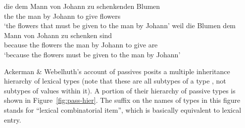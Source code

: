 \documentclass[output=paper
 	        ,biblatex
                ,babelshorthands
                ,newtxmath
                ,draftmode
                ,colorlinks, citecolor=brown
]{langscibook}
\begin{document}
\begin{exe}
	\ex\label{zu-pass}
	\begin{xlist}
		\ex\label{zu-pass-a}
		\gll die dem Mann von Johann zu schenkenden Blumen \\
		the the man by Johann to give flowers  \\
		\glt `the flowers that must be given to the man by Johann'
		\ex\label{zu-pass-b}
		\gll weil die Blumen dem Mann von Johann zu schenken sind \\
		because the flowers the man by Johann to give are \\
		\glt `because the flowers must be given to the man by Johann'
	\end{xlist}
\end{exe}

Ackerman \& Webelhuth's account of  passives posits a multiple inheritance hierarchy of lexical types (note that these are all subtypes of a type , not subtypes of values within it). A portion of their hierarchy of  passive types is shown in Figure~\ref{fig:pass-hier}.
The suffix  on the names of types in this figure stands for ``lexical combinatorial item'', which is basically equivalent to lexical entry.
\end{document}

